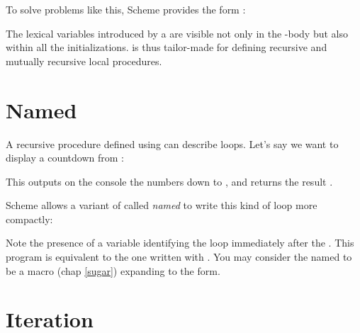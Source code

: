 To solve problems like this, Scheme provides the form
:


\n The lexical variables introduced by a  are
visible not only in the -body but also within
all the initializations.   is thus
tailor-made for defining recursive and mutually
recursive local procedures.



\section{Named }

A recursive procedure defined using  can
describe loops.  Let's say we want to display a
countdown from :


\n This outputs on the console the numbers  down to
, and returns the result .

Scheme allows a variant of  called {\em named}
 to write this kind of loop more compactly:


\n Note the presence of a variable identifying the loop
immediately after the .  This program is
equivalent to the one written with .  You may
consider the named  to be a macro
(chap \ref{sugar}) expanding to the  form.


\section{Iteration}

